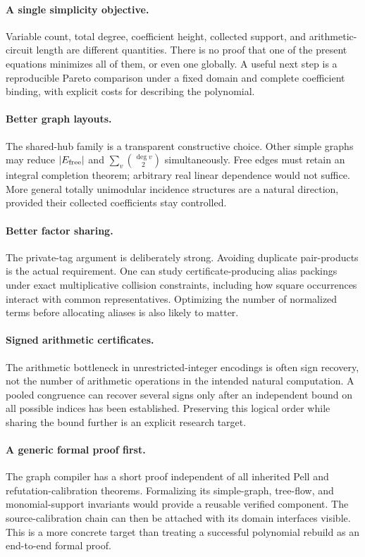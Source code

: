 \documentclass[11pt]{article}
\theoremstyle{definition}\newtheorem{definition}[theorem]{Definition}
\theoremstyle{remark}\newtheorem{remark}[theorem]{Remark}
\begin{document}
\paragraph{A single simplicity objective.}
Variable count, total degree, coefficient height, collected support, and
arithmetic-circuit length are different quantities. There is no proof that one
of the present equations minimizes all of them, or even one globally. A useful
next step is a reproducible Pareto comparison under a fixed domain and complete
coefficient binding, with explicit costs for describing the polynomial.

\paragraph{Better graph layouts.}
The shared-hub family is a transparent constructive choice. Other simple graphs
may reduce $|E_{\rm free}|$ and $\sum_v\binom{\deg v}{2}$ simultaneously.
Free edges must retain an integral completion theorem; arbitrary real linear
dependence would not suffice. More general totally unimodular incidence
structures are a natural direction, provided their collected coefficients stay
controlled.

\paragraph{Better factor sharing.}
The private-tag argument is deliberately strong. Avoiding duplicate pair-products
is the actual requirement. One can study certificate-producing alias packings
under exact multiplicative collision constraints, including how square
occurrences interact with common representatives. Optimizing the number of
normalized terms before allocating aliases is also likely to matter.

\paragraph{Signed arithmetic certificates.}
The arithmetic bottleneck in unrestricted-integer encodings is often sign
recovery, not the number of arithmetic operations in the intended natural
computation. A pooled congruence can recover several signs only after an
independent bound on all possible indices has been established. Preserving this
logical order while sharing the bound further is an explicit research target.

\paragraph{A generic formal proof first.}
The graph compiler has a short proof independent of all inherited Pell and
refutation-calibration theorems. Formalizing its simple-graph, tree-flow, and
monomial-support invariants would provide a reusable verified component.
The source-calibration chain can then be attached with its domain interfaces
visible. This is a more concrete target than treating a successful polynomial
rebuild as an end-to-end formal proof.
\end{document}
